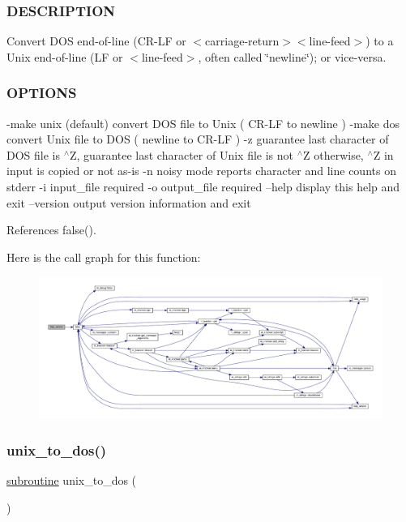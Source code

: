 \subsubsection*{D\+E\+S\+C\+R\+I\+P\+T\+I\+ON}

Convert D\+OS end-\/of-\/line (C\+R-\/\+LF or $<$carriage-\/return$>$$<$line-\/feed$>$) to a Unix end-\/of-\/line (LF or $<$line-\/feed$>$, often called \char`\"{}newline\char`\"{}); or vice-\/versa.

\subsubsection*{O\+P\+T\+I\+O\+NS}

-\/make unix (default) convert D\+OS file to Unix ( C\+R-\/\+LF to newline ) -\/make dos convert Unix file to D\+OS ( newline to C\+R-\/\+LF ) -\/z guarantee last character of D\+OS file is $^\wedge$Z, guarantee last character of Unix file is not $^\wedge$Z otherwise, $^\wedge$Z in input is copied or not as-\/is -\/n noisy mode reports character and line counts on stderr -\/i input\+\_\+file required -\/o output\+\_\+file required --help display this help and exit --version output version information and exit 

References false().

Here is the call graph for this function\+:
\nopagebreak
\begin{figure}[H]
\begin{center}
\leavevmode
\includegraphics[width=350pt]{dtu_8f90_a39c21619b08a3c22f19e2306efd7f766_cgraph}
\end{center}
\end{figure}
\mbox{\label{dtu_8f90_aaa5cd93a63e974bc45e4a6e2d6537ded}} 
\subsubsection{\texorpdfstring{unix\+\_\+to\+\_\+dos()}{unix\_to\_dos()}}
{\footnotesize\ttfamily \hyperlink{M__stopwatch_83_8txt_acfbcff50169d691ff02d4a123ed70482}{subroutine} unix\+\_\+to\+\_\+dos (\begin{DoxyParamCaption}{ }\end{DoxyParamCaption})}



